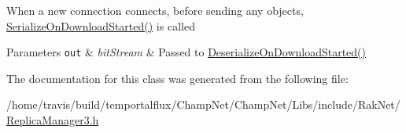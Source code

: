 When a new connection connects, before sending any objects, \hyperlink{class_rak_net_1_1_connection___r_m3_ad3661c8e40c359fc54bdc2066acb8dba}{Serialize\-On\-Download\-Started()} is called 
\begin{DoxyParams}[1]{Parameters}
\mbox{\tt out}  & {\em bit\-Stream} & Passed to \hyperlink{class_rak_net_1_1_connection___r_m3_acf23e94dddb214cf0d631fe074cd4467}{Deserialize\-On\-Download\-Started()} \\
\hline
\end{DoxyParams}


The documentation for this class was generated from the following file\-:\begin{DoxyCompactItemize}
\item 
/home/travis/build/temportalflux/\-Champ\-Net/\-Champ\-Net/\-Libs/include/\-Rak\-Net/\hyperlink{_replica_manager3_8h}{Replica\-Manager3.\-h}\end{DoxyCompactItemize}
